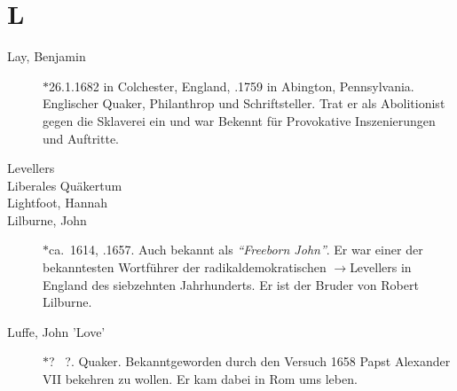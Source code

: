 \section*{L}

\articlesize

\begin{description}

 \item[Lay, Benjamin] $\ast$26.1.1682 in Colchester, England, .1759 in Abington, Pennsylvania. Englischer Quaker, Philanthrop und Schriftsteller. Trat er als Abolitionist gegen die Sklaverei ein und war Bekennt für Provokative Inszenierungen und Auftritte.

 \item[Levellers]


 \item[Liberales Quäkertum]

 \item[Lightfoot, Hannah]

 \item[Lilburne, John] $\ast$ca.~1614, .1657. Auch bekannt als \textit{"`Freeborn John"'}. Er war einer der bekanntesten Wortführer der radikaldemokratischen $\to$Levellers in England des siebzehnten Jahrhunderts. Er ist der Bruder von Robert Lilburne.

 \item[Luffe, John 'Love'] $\ast$? \dag~?. Quaker. Bekanntgeworden durch den Versuch 1658 Papst Alexander VII bekehren zu wollen. Er kam dabei in Rom ums leben.

 \end{description}
\normalsize
